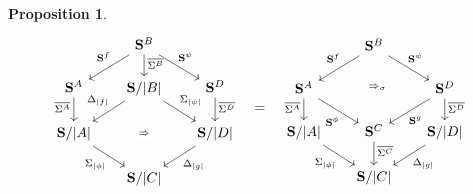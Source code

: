 \documentclass[11pt, oneside, article]{memoir}
\theoremstyle{plain}
\newtheorem{proposition}[theorem]{Proposition}
\theoremstyle{definition}
\theoremstyle{remark}
\DeclarePairedDelimiter{\abs}{\lvert}{\rvert}
\newcommand{\cat}[1]{\mathbf{#1}}
\newcommand{\CoalgOn}[2]{{#2}^{#1}}
\newcommand{\CoalgS}[1]{\CoalgOn{#1}{\bS}}
\newcommand{\pts}[1]{{\abs{#1}}}
\newcommand{\one}[1]{\pts{#1}}
\newcommand{\ptlift}[1]{\overline{#1}}
\newcommand{\carr}{\Sigma}
\newcommand{\leindex}[1]{\Sigma_{#1}}
\newcommand{\reindex}[1]{\Delta_{#1}}
\newcommand{\car}[1]{\carr^{#1}}
\newcommand{\carA}{\car{\cA}}
\newcommand{\carB}{\car{\cB}}
\newcommand{\carC}{\car{\cC}}
\newcommand{\carD}{\car{\cD}}
\newcommand{\com}[2]{{#1}^{#2}}
\newcommand{\con}[2]{{#1}^{#2}}
\newcommand{\cmnd}[1]{{#1}}
\newcommand{\cA}{\cmnd{A}}
\newcommand{\cB}{\cmnd{B}}
\newcommand{\cC}{\cmnd{C}}
\newcommand{\cD}{\cmnd{D}}
\newcommand{\bS}{\cat{S}}
\newcommand{\AS}{\CoalgS{\cA}}
\newcommand{\BS}{\CoalgS{\cB}}
\newcommand{\CS}{\CoalgS{\cC}}
\newcommand{\DS}{\CoalgS{\cD}}
\newcommand{\SA}{\bS/\pts{\cA}}
\newcommand{\SB}{\bS/\pts{\cB}}
\newcommand{\SC}{\bS/\pts{\cC}}
\newcommand{\SD}{\bS/\pts{\cD}}
\begin{document}
\begin{proposition}
\[    %
  \]
  \vspace{-2em}
  \[
    \begin{tikzcd}[column sep=17, row sep=15]
      & \BS & \\
      \AS & \SB & \DS \\
      \SA && \SD \\
      & \SC
      \arrow["{\con{\bS}{f}}"'{pos=0.4}, from=1-2, to=2-1]
      \arrow["{\ptlift{\carB}}"{pos=0.4}, from=1-2, to=2-2]
      \arrow["{\com{\bS}{\psi}}"{pos=0.4}, from=1-2, to=2-3]
      \arrow["{\ptlift{\carA}}"'{pos=0.4}, from=2-1, to=3-1]
      \arrow["{\reindex{\one{f}}}"'{pos=0.4}, from=2-2, to=3-1]
      \arrow["{\leindex{\one{\psi}}}"{pos=0.4}, from=2-2, to=3-3]
      \arrow["\Rightarrow"{description}, draw=none, from=2-2, to=4-2]
      \arrow["{\ptlift{\carD}}"{pos=0.4}, from=2-3, to=3-3]
      \arrow["{\leindex{\one{\phi}}}"', from=3-1, to=4-2]
      \arrow["{\reindex{\one{g}}}", from=3-3, to=4-2]
    \end{tikzcd}
    \;\;\; = \;\;\;
    \begin{tikzcd}[column sep=17, row sep=15]
      & \BS & \\
      \AS && \DS \\
      \SA & \CS & \SD \\
      & \SC
      \arrow["{\con{\bS}{f}}"'{pos=0.4}, from=1-2, to=2-1]
      \arrow["{\com{\bS}{\psi}}"{pos=0.4}, from=1-2, to=2-3]
      \arrow["{\Rightarrow_\sigma}"{description}, shift left, draw=none, from=1-2, to=3-2]
      \arrow["{\ptlift{\carA}}"'{pos=0.4}, from=2-1, to=3-1]
      \arrow["{\com{\bS}{\phi}}"'{pos=0.6}, from=2-1, to=3-2]
      \arrow["{\con{\bS}{g}}"{pos=0.6}, from=2-3, to=3-2]
      \arrow["{\ptlift{\carD}}"{pos=0.4}, from=2-3, to=3-3]
      \arrow["{\leindex{\one{\phi}}}"', from=3-1, to=4-2]
      \arrow["{\ptlift{\carC}}"{pos=0.4}, from=3-2, to=4-2]
      \arrow["{\reindex{\one{g}}}", from=3-3, to=4-2]
    \end{tikzcd}
  \]

\end{proposition}
\end{document}
